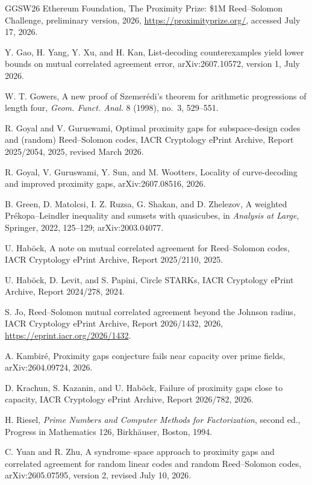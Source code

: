 \documentclass[11pt,a4paper]{amsart}
\numberwithin{equation}{section}
\theoremstyle{remark}
\begin{document}
\begin{thebibliography}{GGSW26}
{Ethereum Foundation},
\newblock The Proximity Prize: \$1M Reed--Solomon Challenge,
\newblock preliminary version, 2026,
\newblock \url{https://proximityprize.org/}, accessed July 17, 2026.

Y. Gao, H. Yang, Y. Xu, and H. Kan,
\newblock List-decoding counterexamples yield lower bounds on mutual
correlated agreement error,
\newblock arXiv:2607.10572, version 1, July 2026.

W. T. Gowers,
\newblock A new proof of Szemer\'edi's theorem for arithmetic progressions
of length four,
\newblock \emph{Geom. Funct. Anal.} 8 (1998), no.~3, 529--551.

R. Goyal and V. Guruswami,
\newblock Optimal proximity gaps for subspace-design codes and (random)
Reed--Solomon codes,
\newblock IACR Cryptology ePrint Archive, Report 2025/2054, 2025,
revised March 2026.

R. Goyal, V. Guruswami, Y. Sun, and M. Wootters,
\newblock Locality of curve-decoding and improved proximity gaps,
\newblock arXiv:2607.08516, 2026.

B. Green, D. Matolcsi, I. Z. Ruzsa, G. Shakan, and D. Zhelezov,
\newblock A weighted Pr\'ekopa--Leindler inequality and sumsets with
quasicubes,
\newblock in \emph{Analysis at Large}, Springer, 2022, 125--129;
\newblock arXiv:2003.04077.

U. Hab\"ock,
\newblock A note on mutual correlated agreement for Reed--Solomon codes,
\newblock IACR Cryptology ePrint Archive, Report 2025/2110, 2025.

U. Hab\"ock, D. Levit, and S. Papini,
\newblock Circle STARKs,
\newblock IACR Cryptology ePrint Archive, Report 2024/278, 2024.

S. Jo,
\newblock Reed--Solomon mutual correlated agreement beyond the Johnson radius,
\newblock IACR Cryptology ePrint Archive, Report 2026/1432, 2026,
\newblock \url{https://eprint.iacr.org/2026/1432}.

A. Kambir\'e,
\newblock Proximity gaps conjecture fails near capacity over prime fields,
\newblock arXiv:2604.09724, 2026.

D. Krachun, S. Kazanin, and U. Hab\"ock,
\newblock Failure of proximity gaps close to capacity,
\newblock IACR Cryptology ePrint Archive, Report 2026/782, 2026.

H. Riesel,
\newblock \emph{Prime Numbers and Computer Methods for Factorization},
second ed., Progress in Mathematics 126, Birkh{\"a}user, Boston, 1994.

C. Yuan and R. Zhu,
\newblock A syndrome--space approach to proximity gaps and correlated
agreement for random linear codes and random Reed--Solomon codes,
\newblock arXiv:2605.07595, version 2, revised July 10, 2026.

\end{thebibliography}
\end{document}
